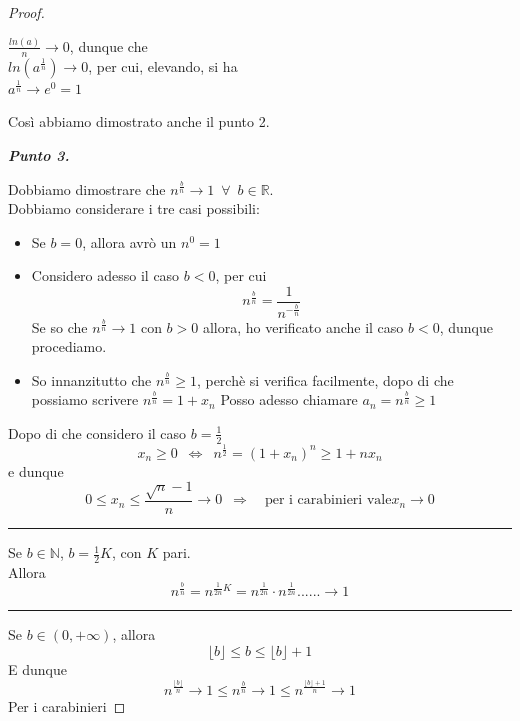 \documentclass{article}
\theoremstyle{definition}
\newcommand{\linea}{\vspace{15pt}\hrule\vspace{15pt}}
\newcommand{\N}{\mathbb{N}}
\begin{document}
\begin{proof}
\begin{center}
    $\frac{ln(a)}{n} \longrightarrow 0$, dunque che
    \\
    $ln(a^{\frac{1}{n}}) \longrightarrow 0$, per cui, elevando, si ha
    \\
    $a^{\frac{1}{n}} \longrightarrow e^0=1$
\end{center}
Così abbiamo dimostrato anche il punto 2.
\begin{center}
   \textbf{\textit{Punto 3.}} 
\end{center}
Dobbiamo dimostrare che $n^{\frac{b}{n}} \longrightarrow 1 \,\,\, \forall \,\,\, b \in \mathbb{R}$.
\\
Dobbiamo considerare i tre casi possibili:
\begin{itemize}
    \item Se $b=0$, allora avrò un $n^0=1$
    \item Considero adesso il caso $b < 0$, per cui
    \begin{equation}
        n^{\frac{b}{n}}=\frac{1}{n^{-\frac{b}{n}}}
    \end{equation}
    Se so che $n^{\frac{b}{n}} \to 1$ con $b>0$ allora, ho verificato anche il caso $b<0$, dunque procediamo.
    \item So innanzitutto che $n^{\frac{b}{n}} \geqslant 1$, perchè si verifica facilmente, dopo di che possiamo scrivere $n^{\frac{b}{n}}=1+x_n$
    Posso adesso chiamare $a_n=n^{\frac{b}{n}}\geqslant1$
\end{itemize}
Dopo di che considero il caso $b=\frac{1}{2}$
\begin{equation}
    x_n \geqslant 0 \,\,\, \Longleftrightarrow \,\,\, n^{\frac{1}{2}}=(1+x_n)^n \geqslant 1+nx_n
\end{equation}
e dunque
\begin{equation}
    0 \leqslant x_n \leqslant \frac{\sqrt{n}-1}{n} \to 0 \,\,\, \Longrightarrow \,\,\,\,\,\, \mbox{per i carabinieri vale} x_n \to 0
\end{equation}
\linea{Passo 2}
Se $b \in \N$, $b= \frac{1}{2}K$, con $K$ pari.
\\
Allora 
\begin{equation}
    n^{\frac{b}{n}}=n^{\frac{1}{2n}K}=n^{\frac{1}{2n}}\cdot n^{\frac{1}{2n}}...... \to 1
\end{equation}
\linea{}
Se $b \in (0,+\infty)$, allora
\begin{equation}
    \lfloor b \rfloor \leqslant b \leqslant \lfloor b \rfloor + 1
\end{equation}
E dunque
\begin{equation}
    n^{\frac{\lfloor b \rfloor}{n}} \to 1 \leqslant n ^{\frac{b}{n}} \to 1 \leqslant n^{\frac{\lfloor b \rfloor +1}{n}} \to 1
\end{equation}
Per i carabinieri
\end{proof}
\end{document}
